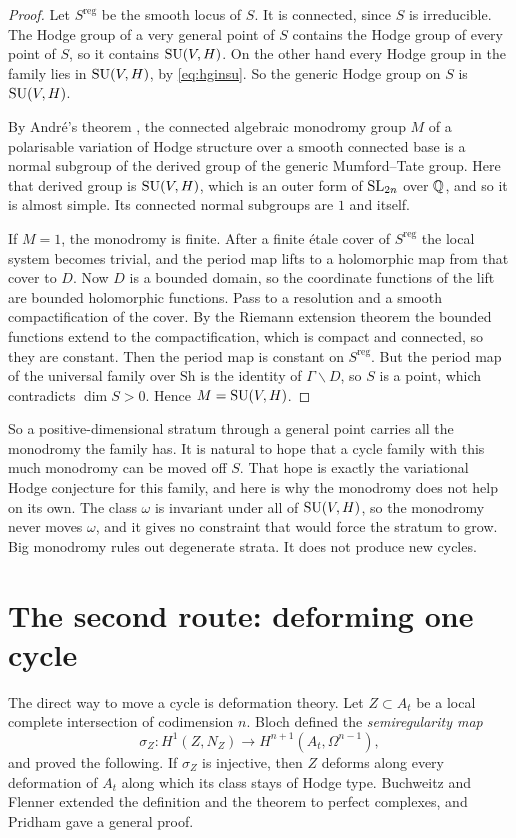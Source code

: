 \begin{proof}
Let $S^{\mathrm{reg}}$ be the smooth locus of $S$. It is connected, since
$S$ is irreducible. The Hodge group of a very general point of $S$ contains
the Hodge group of every point of $S$, so it contains $\operatorname{SU}(V,H)$. On the
other hand every Hodge group in the family lies in $\operatorname{SU}(V,H)$, by
\eqref{eq:hginsu}.
So the generic Hodge group on $S$ is $\operatorname{SU}(V,H)$.

By Andr\'e's theorem \cite{And92}, the connected algebraic monodromy group
$M$ of a polarisable variation of Hodge structure over a smooth connected
base is a normal subgroup of the derived group of the generic
Mumford--Tate group. Here that derived group is $\operatorname{SU}(V,H)$, which is an
outer form of $\operatorname{SL}_{2n}$ over $\mathbb{Q}$, and so it is almost simple. Its
connected normal subgroups are $1$ and itself.

If $M=1$, the monodromy is finite. After a finite \'etale cover of
$S^{\mathrm{reg}}$ the local system becomes trivial, and the period map
lifts to a holomorphic map from that cover to $D$. Now $D$ is a bounded
domain, so the coordinate functions of the lift are bounded holomorphic
functions. Pass to a resolution and a smooth compactification of the
cover. By the Riemann extension theorem the bounded functions extend to the
compactification, which is compact and connected, so they are constant.
Then the period map is constant on $S^{\mathrm{reg}}$. But the period map of
the universal family over $\mathrm{Sh}$ is the identity of $\Gamma\backslash D$, so
$S$ is a point, which contradicts $\dim S>0$. Hence $M=\operatorname{SU}(V,H)$.
\end{proof}

So a positive-dimensional stratum through a general point carries all the
monodromy the family has. It is natural to hope that a cycle family with
this much monodromy can be moved off $S$. That hope is exactly the
variational Hodge conjecture for this family, and here is why the
monodromy does not help on its own. The class $\omega$ is invariant under
all of $\operatorname{SU}(V,H)$, so the monodromy never moves $\omega$, and it gives no
constraint that would force the stratum to grow. Big monodromy rules out
degenerate strata. It does not produce new cycles.

\section{The second route: deforming one cycle}

The direct way to move a cycle is deformation theory. Let $Z\subset A_{t}$
be a local complete intersection of codimension $n$. Bloch \cite{Blo72}
defined the \emph{semiregularity map}
\[
  \sigma_{Z}\colon H^{1}(Z,N_{Z})\longrightarrow H^{n+1}(A_{t},\Omega^{n-1}),
\]
and proved the following. If $\sigma_{Z}$ is injective, then $Z$ deforms
along every deformation of $A_{t}$ along which its class stays of Hodge type.
Buchweitz and Flenner \cite{BF03} extended the definition and the theorem
to perfect complexes, and Pridham \cite{Pri24} gave a general proof.

